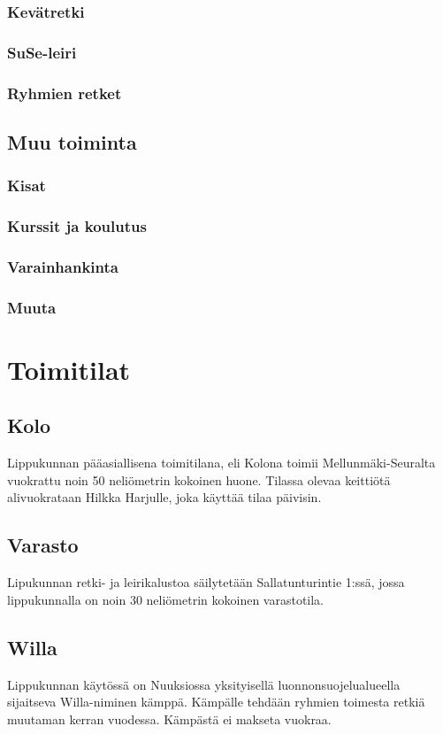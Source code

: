 \documentclass[a4paper, 12pt, finnish]{report} %
\begin{document}
\subsubsection{Kevätretki}
\subsubsection{SuSe-leiri}
\subsubsection{Ryhmien retket}
\subsection{Muu toiminta}
\subsubsection{Kisat}
\subsubsection{Kurssit ja koulutus}
\subsubsection{Varainhankinta}
\subsubsection{Muuta}
\section{Toimitilat}
\subsection{Kolo}
Lippukunnan pääasiallisena toimitilana, eli Kolona toimii Mellunmäki-Seuralta vuokrattu noin 50 neliömetrin kokoinen huone. Tilassa olevaa keittiötä alivuokrataan Hilkka Harjulle, joka käyttää tilaa päivisin.
\subsection{Varasto}
Lipukunnan retki- ja leirikalustoa säilytetään Sallatunturintie 1:ssä, jossa lippukunnalla on noin 30 neliömetrin kokoinen varastotila. 
\subsection{Willa}
Lippukunnan käytössä on Nuuksiossa yksityisellä luonnonsuojelualueella sijaitseva Willa-niminen kämppä. Kämpälle tehdään ryhmien toimesta retkiä muutaman kerran vuodessa. Kämpästä ei makseta vuokraa.
\end{document}
